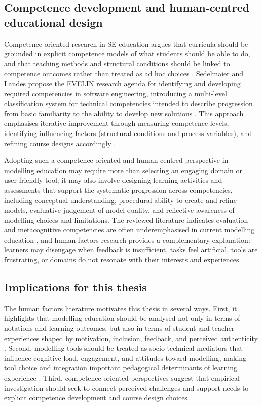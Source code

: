\subsection{Competence development and human-centred educational design}
\label{subsec:hf_competence_design}

Competence-oriented research in SE education argues that curricula should be grounded in explicit competence models of what students should be able to do, and that teaching methods and structural conditions should be linked to competence outcomes rather than treated as ad hoc choices \cite{sedelmaier2013research}. Sedelmaier and Landes propose the EVELIN research agenda for identifying and developing required competencies in software engineering, introducing a multi-level classification system for technical competencies intended to describe progression from basic familiarity to the ability to develop new solutions \cite{sedelmaier2013research}. This approach emphasises iterative improvement through measuring competence levels, identifying influencing factors (structural conditions and process variables), and refining course designs accordingly \cite{sedelmaier2013research}. 

Adopting such a competence-oriented and human-centred perspective in modelling education may require more than selecting an engaging domain or user-friendly tool; it may also involve designing learning activities and assessments that support the systematic progression across competencies, including conceptual understanding, procedural ability to create and refine models, evaluative judgement of model quality, and reflective awareness of modelling choices and limitations. The reviewed literature indicates evaluation and metacognitive competencies are often underemphasised in current modelling education \cite{bogdanova2017domain,bogdanova2019camelot,bork2019framework}, and human factors research provides a complementary explanation: learners may disengage when feedback is insufficient, tasks feel artificial, tools are frustrating, or domains do not resonate with their interests and experiences.

\subsection{Implications for this thesis}
\label{subsec:hf_implications_thesis}

The human factors literature motivates this thesis in several ways. First, it highlights that modelling education should be analysed not only in terms of notations and learning outcomes, but also in terms of student and teacher experiences shaped by motivation, inclusion, feedback, and perceived authenticity \cite{grassl2026dei,holmes2018dimensions}. Second, modelling tools should be treated as socio-technical mediators that influence cognitive load, engagement, and attitudes toward modelling, making tool choice and integration important pedagogical determinants of learning experience \cite{liebel2017model,human-factors-mde}. Third, competence-oriented perspectives suggest that empirical investigation should seek to connect perceived challenges and support needs to explicit competence development and course design choices \cite{sedelmaier2013research}.

